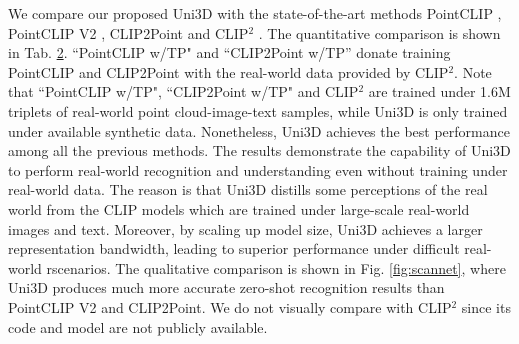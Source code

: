 \documentclass{article} \usepackage{iclr2024_conference,times}
\def\Ours{Uni3D\xspace}
\begin{document}
We compare our proposed \Ours with the state-of-the-art methods PointCLIP \citep{zhang2022pointclip}, PointCLIP V2 \citep{zhu2022pointclipv2}, CLIP2Point \citep{huang2022clip2point} and CLIP$^2$ \citep{zeng2023clip2}. The quantitative comparison is shown in Tab. \hyperref[tab:scannet]{2}. ``PointCLIP w/TP" and ``CLIP2Point w/TP'' donate training PointCLIP and CLIP2Point with the real-world data provided by CLIP$^2$. Note that ``PointCLIP w/TP", ``CLIP2Point w/TP" and CLIP$^2$ are trained under 1.6M triplets of real-world point cloud-image-text samples, while \Ours is only trained under available synthetic data. Nonetheless, \Ours achieves the best performance among all the previous methods. The results demonstrate the capability of \Ours to perform real-world recognition and understanding even without training under real-world data. The reason is that \Ours distills some perceptions of the real world from the CLIP models which are trained under large-scale real-world images and text. Moreover, by scaling up model size, \Ours achieves a larger representation bandwidth, leading to superior performance under difficult real-world rscenarios. The qualitative comparison is shown in Fig. \ref{fig:scannet}, where \Ours produces much more accurate zero-shot recognition results than PointCLIP V2 and CLIP2Point. We do not visually compare with CLIP$^2$ since its code and model are not publicly available.
\end{document}
